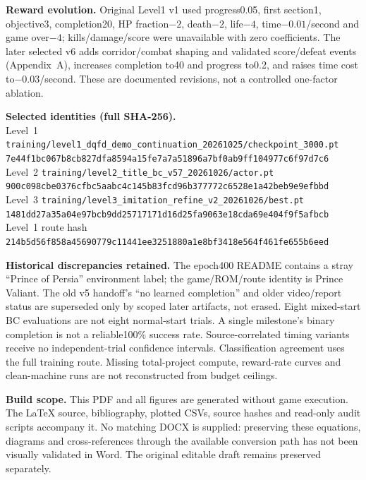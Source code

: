 \documentclass[11pt,a4paper]{article}
\newcommand{\pathref}[1]{\nolinkurl{#1}}
\begin{document}
\textbf{Reward evolution.} Original Level1 v1 used progress0.05, first section1, objective3, completion20, HP fraction$-2$, death$-2$, life$-4$, time$-0.01$/second and game over$-4$; kills/damage/score were unavailable with zero coefficients. The later selected v6 adds corridor/combat shaping and validated score/defeat events (Appendix~A), increases completion to40 and progress to0.2, and raises time cost to$-0.03$/second. These are documented revisions, not a controlled one-factor ablation.

\textbf{Selected identities (full SHA-256).}\\
Level~1 \pathref{training/level1_dqfd_demo_continuation_20261025/checkpoint_3000.pt}\\
\pathref{7e44f1bc067b8cb827dfa8594a15fe7a7a51896a7bf0ab9ff104977c6f97d7c6}\\
Level~2 \pathref{training/level2_title_bc_v57_20261026/actor.pt}\\
\pathref{900c098cbe0376cfbc5aabc4c145b83fcd96b377772c6528e1a42beb9e9efbbd}\\
Level~3 \pathref{training/level3_imitation_refine_v2_20261026/best.pt}\\
\pathref{1481dd27a35a04e97bcb9dd25717171d16d25fa9063e18cda69e404f9f5afbcb}\\
Level~1 route hash\\
\pathref{214b5d56f858a45690779c11441ee3251880a1e8bf3418e564f461fe655b6eed}

\textbf{Historical discrepancies retained.} The epoch400 README contains a stray ``Prince of Persia'' environment label; the game/ROM/route identity is Prince Valiant. The old v5 handoff's ``no learned completion'' and older video/report status are superseded only by scoped later artifacts, not erased. Eight mixed-start BC evaluations are not eight normal-start trials. A single milestone's binary completion is not a reliable100\% success rate. Source-correlated timing variants receive no independent-trial confidence intervals. Classification agreement uses the full training route. Missing total-project compute, reward-rate curves and clean-machine runs are not reconstructed from budget ceilings.

\textbf{Build scope.} This PDF and all figures are generated without game execution. The LaTeX source, bibliography, plotted CSVs, source hashes and read-only audit scripts accompany it. No matching DOCX is supplied: preserving these equations, diagrams and cross-references through the available conversion path has not been visually validated in Word. The original editable draft remains preserved separately.
\end{document}

